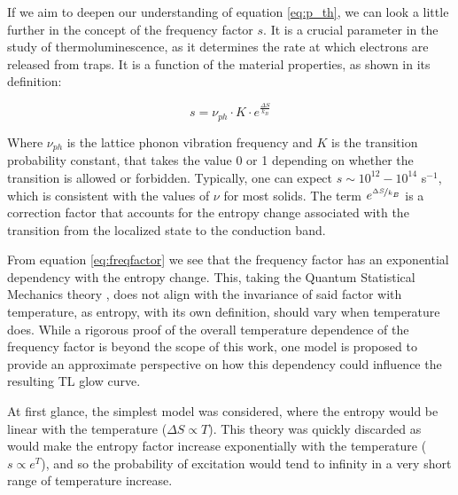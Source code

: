 \vspace{10pt}

If we aim to deepen our understanding of equation \ref{eq:p_th}, we can look a little further in the concept of the frequency factor $s$. It is a crucial parameter in the study of thermoluminescence, as it determines the rate at which electrons are released from traps. It is a function of the material properties, as shown in its definition:

\begin{equation} \label{eq:freqfactor}
  s = \nu_{ph} \cdot K \cdot e^{\frac{\Delta S}{k_B}}
\end{equation}

\vspace{10pt}
Where $\nu_{ph}$ is the lattice phonon vibration frequency and $K$ is the transition probability constant, that takes the value 0 or 1 depending on whether the transition is allowed or forbidden. Typically, one can expect $s \sim 10^{12} -10^{14}$ s$^{-1}$, which is consistent with the values of $\nu$ for most solids. The term $e^{\nicefrac{\Delta S}{k_B}}$ is a correction factor that accounts for the entropy change associated with the transition from the localized state to the conduction band. 

\vspace{10pt}

From equation \ref{eq:freqfactor} we see that the frequency factor has an exponential dependency with the entropy change. This, taking the Quantum Statistical Mechanics theory \cite{brey}, does not align with the invariance of said factor with temperature, as entropy, with its own definition, should vary when temperature does. While a rigorous proof of the overall temperature dependence of the frequency factor is beyond the scope of this work, one model is proposed to provide an approximate perspective on how this dependency could influence the resulting TL glow curve. 

\vspace{10pt}

At first glance, the simplest model was considered, where the entropy would be linear with the temperature ($\Delta S \propto T$). This theory was quickly discarded as would make the entropy factor increase exponentially with the temperature ($s \propto e^T$), and so the probability of excitation would tend to infinity in a very short range of temperature increase.

\vspace{10pt}

